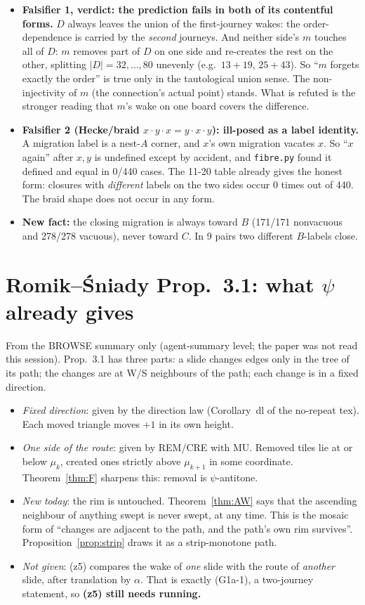 \documentclass[11pt]{article}
\theoremstyle{definition}\newtheorem{definition}[theorem]{Definition}\newtheorem{remark}[theorem]{Remark}
\begin{document}
\begin{itemize}
\item \textbf{Falsifier 1, verdict: the prediction fails in both of its contentful forms.} $D$ always leaves the union of the first-journey wakes: the order-dependence is carried by the \emph{second} journeys. And neither side's $m$ touches all of $D$: $m$ removes part of $D$ on one side and re-creates the rest on the other, splitting $|D|=32,\dots,80$ unevenly (e.g.\ $13+19$, $25+43$).
So ``$m$ forgets exactly the order'' is true only in the tautological union sense. The non-injectivity of $m$ (the connection's actual point) stands. What is refuted is the stronger reading that $m$'s wake on one board covers the difference.
\item \textbf{Falsifier 2 (Hecke/braid $x\cdot y\cdot x=y\cdot x\cdot y$): ill-posed as a label identity.} A migration label is a nest-$A$ corner, and $x$'s own migration vacates $x$. So ``$x$ again'' after $x,y$ is undefined except by accident, and \texttt{fibre.py} found it defined and equal in 0/440 cases.
The 11-20 table already gives the honest form: closures with \emph{different} labels on the two sides occur 0 times out of 440. The braid shape does not occur in any form.
\item \textbf{New fact:} the closing migration is always toward $B$ (171/171 nonvacuous and 278/278 vacuous), never toward $C$. In 9 pairs two different $B$-labels close.
\end{itemize}

\section{Romik--\'Sniady Prop.~3.1: what $\psi$ already gives}\label{sec:rs}
From the BROWSE summary only (agent-summary level; the paper was not read this session). Prop.~3.1 has three parts: a slide changes edges only in the tree of its path; the changes are at W/S neighbours of the path; each change is in a fixed direction.
\begin{itemize}
\item \emph{Fixed direction}: given by the direction law (Corollary~dl of the no-repeat tex). Each moved triangle moves $+1$ in its own height.
\item \emph{One side of the route}: given by REM/CRE with MU. Removed tiles lie at or below $\mu_k$, created ones strictly above $\mu_{k+1}$ in some coordinate. Theorem~\ref{thm:F} sharpens this: removal is $\psi$-antitone.
\item \emph{New today}: the rim is untouched. Theorem~\ref{thm:AW} says that the ascending neighbour of anything swept is never swept, at any time. This is the mosaic form of ``changes are adjacent to the path, and the path's own rim survives''. Proposition~\ref{prop:strip} draws it as a strip-monotone path.
\item \emph{Not given}: (z5) compares the wake of \emph{one} slide with the route of \emph{another} slide, after translation by $\alpha$. That is exactly (G1a-1), a two-journey statement, so \textbf{(z5) still needs running.}
\end{itemize}
\end{document}
